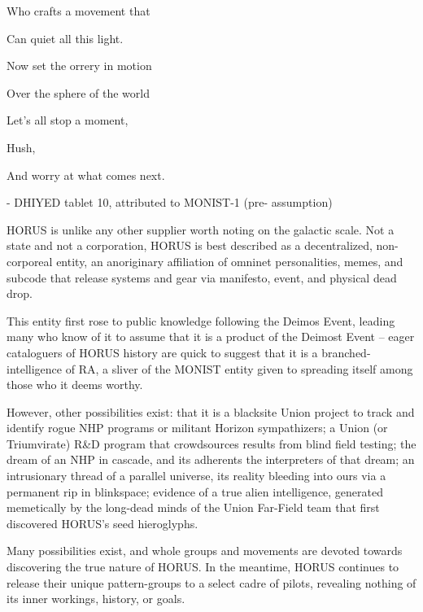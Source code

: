                                      Who crafts a movement that   

                                     Can quiet all this light.  

                                    Now set the orrery in motion   

                                     Over the sphere of the world  

                                    Let’s all stop a moment,   

                                    Hush,   

                                    And worry at what comes next.   

                                         -    DHIYED tablet 10, attributed to MONIST-1 (pre- 
                                              assumption)  

HORUS is unlike any other supplier worth noting on the galactic scale. Not a state and not a  
corporation, HORUS is best described as a decentralized, non-corporeal entity, an anoriginary  
affiliation of omninet personalities, memes, and subcode that release systems and gear via  
manifesto, event, and physical dead drop.   

This entity first rose to public knowledge following the Deimos Event, leading many who know of it  
to assume that it is a product of the Deimost Event -- eager cataloguers of HORUS history are  
quick to suggest that it is a branched-intelligence of RA, a sliver of the MONIST entity given to  
spreading itself among those who it deems worthy.   

However, other possibilities exist: that it is a blacksite Union project to track and identify rogue  
NHP programs or militant Horizon sympathizers; a Union (or Triumvirate) R\&D program that  
crowdsources results from blind field testing; the dream of an NHP in cascade, and its adherents  
the interpreters of that dream; an intrusionary thread of a parallel universe, its reality bleeding into  
ours via a permanent rip in blinkspace; evidence of a true alien intelligence, generated  
memetically by the long-dead minds of the Union Far-Field team that first discovered HORUS’s  
seed hieroglyphs.    

Many possibilities exist, and whole groups and movements are devoted towards discovering the  
true nature of HORUS. In the meantime, HORUS continues to release their unique pattern-groups  
to a select cadre of pilots, revealing nothing of its inner workings, history, or goals.    

